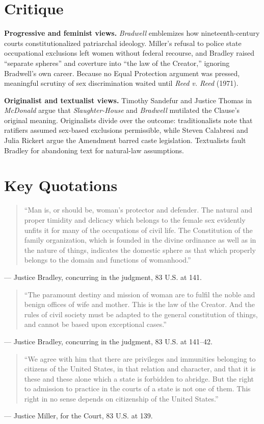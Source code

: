 \documentclass[12pt]{article}
\begin{document}
\section{Critique}

\textbf{Progressive and feminist views.} \textit{Bradwell} emblemizes how nineteenth-century courts constitutionalized patriarchal ideology. Miller's refusal to police state occupational exclusions left women without federal recourse, and Bradley raised ``separate spheres'' and coverture into ``the law of the Creator,'' ignoring Bradwell's own career. Because no Equal Protection argument was pressed, meaningful scrutiny of sex discrimination waited until \textit{Reed v. Reed} (1971).

\textbf{Originalist and textualist views.} Timothy Sandefur and Justice Thomas in \textit{McDonald} argue that \textit{Slaughter-House} and \textit{Bradwell} mutilated the Clause's original meaning. Originalists divide over the outcome: traditionalists note that ratifiers assumed sex-based exclusions permissible, while Steven Calabresi and Julia Rickert argue the Amendment barred caste legislation. Textualists fault Bradley for abandoning text for natural-law assumptions.

\section{Key Quotations}

\begin{quote}
``Man is, or should be, woman's protector and defender. The natural and proper timidity and delicacy which belongs to the female sex evidently unfits it for many of the occupations of civil life. The Constitution of the family organization, which is founded in the divine ordinance as well as in the nature of things, indicates the domestic sphere as that which properly belongs to the domain and functions of womanhood.''
\end{quote}
\noindent --- Justice Bradley, concurring in the judgment, 83 U.S. at 141.

\begin{quote}
``The paramount destiny and mission of woman are to fulfil the noble and benign offices of wife and mother. This is the law of the Creator. And the rules of civil society must be adapted to the general constitution of things, and cannot be based upon exceptional cases.''
\end{quote}
\noindent --- Justice Bradley, concurring in the judgment, 83 U.S. at 141--42.

\begin{quote}
``We agree with him that there are privileges and immunities belonging to citizens of the United States, in that relation and character, and that it is these and these alone which a state is forbidden to abridge. But the right to admission to practice in the courts of a state is not one of them. This right in no sense depends on citizenship of the United States.''
\end{quote}
\noindent --- Justice Miller, for the Court, 83 U.S. at 139.
\end{document}
